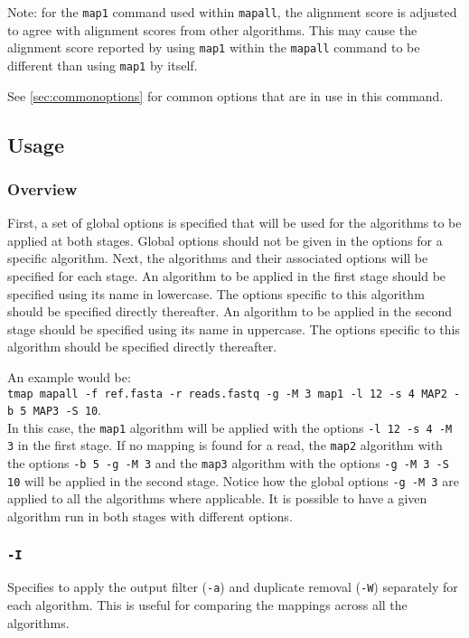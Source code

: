 \documentclass[a4paper,12pt]{book}
\newcommand{\TT}[1]{{\tt #1}} %
\begin{document}
Note: for the \TT{map1} command used within \TT{mapall}, the alignment score is adjusted to agree with alignment scores from other algorithms.
This may cause the alignment score reported by using \TT{map1} within the \TT{mapall} command to be different than using \TT{map1} by itself.

See \autoref{sec:commonoptions} for common options that are in use in this command.

\subsection{Usage}

\subsubsection{Overview}
First, a set of global options is specified that will be used for the algorithms to be applied at both stages.
Global options should not be given in the options for a specific algorithm.
Next, the algorithms and their associated options will be specified for each stage.
An algorithm to be applied in the first stage should be specified using its name in lowercase.
The options specific to this algorithm should be specified directly thereafter.
An algorithm to be applied in the second stage should be specified using its name in uppercase.
The options specific to this algorithm should be specified directly thereafter.

An example would be:\\
\TT{tmap mapall -f ref.fasta -r reads.fastq -g -M 3 map1 -l 12 -s 4 MAP2 -b 5 MAP3 -S 10}.\\
In this case, the \TT{map1} algorithm will be applied with the options \TT{-l 12 -s 4 -M 3} in the first stage.
If no mapping is found for a read, the \TT{map2} algorithm with the options \TT{-b 5 -g -M 3} and the \TT{map3} algorithm with the options \TT{-g -M 3 -S 10} will be applied in the second stage.
Notice how the global options \TT{-g -M 3} are applied to all the algorithms where applicable.
It is possible to have a given algorithm run in both stages with different options.

\subsubsection{\TT{-I}}
Specifies to apply the output filter (\TT{-a}) and duplicate removal (\TT{-W}) separately for each algorithm.
This is useful for comparing the mappings across all the algorithms.
\end{document}
